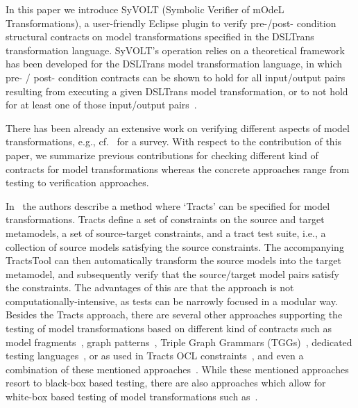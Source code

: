 In this paper we introduce SyVOLT (Symbolic Verifier of mOdeL Transformations),
a user-friendly Eclipse plugin to verify pre-/post- condition structural contracts
on model transformations specified in the DSLTrans transformation language.
SyVOLT's operation relies on a theoretical framework has been developed for the
DSLTrans model transformation language, in which pre- / post- condition
contracts can be shown to hold for all input/output pairs resulting from
executing a given DSLTrans model transformation, or to not hold for at least one
of those input/output pairs~\cite{Lucio2014}.


There has been already an extensive work on verifying different aspects of model
transformations, e.g., cf.~\cite{AmraniLSCDVTC12} for a survey.
With respect to the contribution of this paper, we summarize previous
contributions for checking different kind of contracts for model transformations
whereas the concrete approaches range from testing to verification approaches.

In~\cite{Gogolla2011,Vallecillo2012} the authors describe a method where
`Tracts' can be specified for model transformations. Tracts define a set of
constraints on the source and target metamodels, a set of source-target
constraints, and a tract test suite, i.e., a collection of source models
satisfying the source constraints. The accompanying TractsTool can then
automatically transform the source models into the target metamodel, and
subsequently verify that the source/target model pairs satisfy the constraints.
The advantages of this are that the approach is not computationally-intensive,
as tests can be narrowly focused in a modular way. Besides the Tracts approach,
there are several other approaches supporting the testing of model
transformations based on different kind of contracts such as model
fragments~\cite{Mottu2008}, graph patterns~\cite{Guerra12,BaloghBCGHMPPRVa10},
Triple Graph Grammars (TGGs)~\cite{WieberAS14}, dedicated testing
languages~\cite{Kolovos06,Garcia-Dominguez11}, or as used in Tracts OCL
constraints~\cite{Cariou09}, and even a combination of these mentioned
approaches~\cite{Pele}. While these mentioned approaches resort to black-box
based testing, there are also approaches which allow for white-box based testing
of model transformations such as~\cite{GonzalezC12}.

